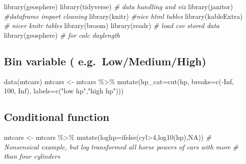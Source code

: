 \documentclass[
]{article}
\newenvironment{Shaded}{\begin{snugshade}}{\end{snugshade}}
\newcommand{\AttributeTok}[1]{\textcolor[rgb]{0.77,0.63,0.00}{#1}}
\newcommand{\CommentTok}[1]{\textcolor[rgb]{0.56,0.35,0.01}{\textit{#1}}}
\newcommand{\ConstantTok}[1]{\textcolor[rgb]{0.00,0.00,0.00}{#1}}
\newcommand{\DecValTok}[1]{\textcolor[rgb]{0.00,0.00,0.81}{#1}}
\newcommand{\FunctionTok}[1]{\textcolor[rgb]{0.00,0.00,0.00}{#1}}
\newcommand{\NormalTok}[1]{#1}
\newcommand{\OtherTok}[1]{\textcolor[rgb]{0.56,0.35,0.01}{#1}}
\newcommand{\SpecialCharTok}[1]{\textcolor[rgb]{0.00,0.00,0.00}{#1}}
\newcommand{\StringTok}[1]{\textcolor[rgb]{0.31,0.60,0.02}{#1}}
\begin{document}
\begin{Shaded}
\begin{Highlighting}[]
\FunctionTok{library}\NormalTok{(geosphere)}
\FunctionTok{library}\NormalTok{(tidyverse) }\CommentTok{\# data handling and viz}
\FunctionTok{library}\NormalTok{(janitor) }\CommentTok{\#dataframe import cleaning}
\FunctionTok{library}\NormalTok{(knitr) }\CommentTok{\#nice html tables}
\FunctionTok{library}\NormalTok{(kableExtra) }\CommentTok{\# nicer knitr tables}
\FunctionTok{library}\NormalTok{(broom)}
\FunctionTok{library}\NormalTok{(readr) }\CommentTok{\# load csv stored data}
\FunctionTok{library}\NormalTok{(geosphere) }\CommentTok{\# for calc daylength}
\end{Highlighting}
\end{Shaded}

\hypertarget{bin-variable-e.g.-lowmediumhigh}{%
\subsection{Bin variable ( e.g.~Low/Medium/High)}\label{bin-variable-e.g.-lowmediumhigh}}

\begin{Shaded}
\begin{Highlighting}[]
\FunctionTok{data}\NormalTok{(mtcars)}
\NormalTok{mtcars }\OtherTok{\textless{}{-}}\NormalTok{ mtcars }\SpecialCharTok{\%\textgreater{}\%} \FunctionTok{mutate}\NormalTok{(}\AttributeTok{hp\_cat=}\FunctionTok{cut}\NormalTok{(hp, }\AttributeTok{breaks=}\FunctionTok{c}\NormalTok{(}\SpecialCharTok{{-}}\ConstantTok{Inf}\NormalTok{, }\DecValTok{100}\NormalTok{, }\ConstantTok{Inf}\NormalTok{), }
                                       \AttributeTok{labels=}\FunctionTok{c}\NormalTok{(}\StringTok{"low hp"}\NormalTok{,}\StringTok{"high hp"}\NormalTok{)))}
\end{Highlighting}
\end{Shaded}

\hypertarget{conditional-function}{%
\subsection{Conditional function}\label{conditional-function}}

\begin{Shaded}
\begin{Highlighting}[]
\NormalTok{mtcars }\OtherTok{\textless{}{-}}\NormalTok{ mtcars }\SpecialCharTok{\%\textgreater{}\%} \FunctionTok{mutate}\NormalTok{(}\AttributeTok{loghp=}\FunctionTok{ifelse}\NormalTok{(cyl}\SpecialCharTok{\textgreater{}}\DecValTok{4}\NormalTok{,}\FunctionTok{log10}\NormalTok{(hp),}\ConstantTok{NA}\NormalTok{)) }
\CommentTok{\# Nonsensical example, but log transformed all horse powers of cars with more}
\CommentTok{\# than four cylinders}
\end{Highlighting}
\end{Shaded}
\end{document}
